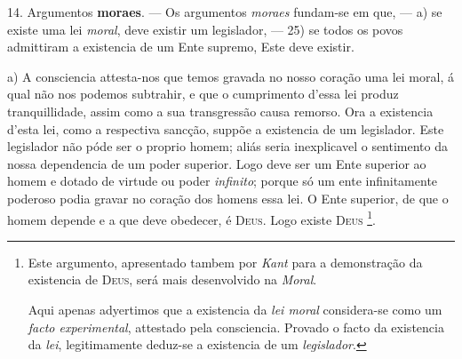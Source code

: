 14. Argumentos \textbf{moraes}. --- Os argumentos \emph{moraes} fundam-se em que, --- a) se existe uma lei \emph{moral}, deve existir um legislador, --- 25) se todos os povos admittiram a existencia de um Ente supremo, Este deve existir.

a) A consciencia attesta-nos que temos gravada no nosso coração uma lei moral, á qual não nos podemos subtrahir, e que o cumprimento d'essa lei produz tranquillidade, assim como a sua transgressão causa remorso. Ora a existencia d'esta lei, como a respectiva sancção, suppõe a existencia de um legislador. Este legislador não póde ser o proprio homem; aliás seria inexplicavel o sentimento da nossa dependencia de um poder superior. Logo deve ser um Ente superior ao homem e dotado de virtude ou poder \emph{infinito}; porque só um ente infinitamente poderoso podia gravar no coração dos homens essa lei. O Ente superior, de que o homem depende e a que deve obedecer, é \textsc{Deus}. Logo existe \textsc{Deus} \footnote{Este argumento, apresentado tambem por \emph{Kant} para a demonstração da existencia de \textsc{Deus}, será mais desenvolvido na \emph{Moral}.\par Aqui apenas adyertimos que a existencia da \emph{lei moral} considera-se como um \emph{facto experimental}, attestado pela consciencia. Provado o facto da existencia da \emph{lei}, legitimamente deduz-se a existencia de um \emph{legislador}.}.


